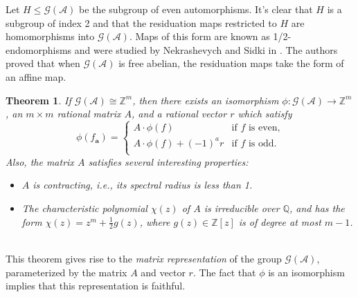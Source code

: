 \documentclass[12pt, letterpaper]{article}
\newcommand{\Z}{\mathbb Z}
\newcommand{\Q}{\mathbb Q}
\newcommand{\A}{\mathcal A}
\newcommand{\ch}[1]{\mathbf{#1}}
\newcommand{\res}[2]{{{#1}_{\ch{#2}}}}
\newcommand{\gp}{\mathcal G}
\newtheorem{thm}{Theorem}[section]
\begin{document}
Let $H \le \gp(\A)$ be the subgroup of even automorphisms. It's clear that $H$
is a subgroup of index 2 and that the residuation maps restricted to $H$ are
homomorphisms into $\gp(\A)$. Maps of this form are known as 1/2-endomorphisms
and were studied by Nekrashevych and Sidki in
\cite{nekrashevych2004automorphisms}. The authors proved that when $\gp(\A)$ is
free abelian, the residuation maps take the form of an affine map.
\begin{thm}\label{thm:nekrashevych_sidki}
    If $\gp(\A) \cong \Z^m$, then there exists an isomorphism $\phi : \gp(\A)
    \rightarrow \Z^m$, an $m \times m$ rational matrix $A$, and a rational
    vector $r$ which satisfy
    \begin{equation}\label{eq:Aresiduals}
        \phi(\res{f}{a}) = \begin{cases}
            A \cdot \phi(f) & \text{if $f$ is even,}\\
            A \cdot \phi(f) + (-1)^a r &
            \text{if $f$ is odd.}\\
        \end{cases}
    \end{equation}
    Also, the matrix $A$ satisfies several interesting properties:
    \begin{itemize}
        \item $A$ is contracting, i.e., its spectral radius is less than 1.
        \item The characteristic polynomial $\chi(z)$ of $A$ is irreducible
            over $\Q$, and has the form $\chi(z) = z^m + \frac{1}{2}g(z)$,
            where $g(z) \in \Z[z]$ is of degree at most $m-1$.
    \end{itemize}
\end{thm}\hfill\\
This theorem gives rise to the \emph{matrix representation} of the group
$\gp(\A)$, parameterized by the matrix $A$ and vector $r$. The fact that $\phi$
is an isomorphism implies that this representation is faithful.
\end{document}
